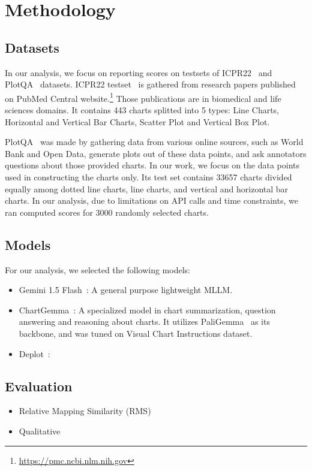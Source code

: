 \documentclass[
	letterpaper, %
]{jdf}
\begin{document}
\section{Methodology}\label{sect:methodology}
\subsection{Datasets}
In our analysis, we focus on reporting scores on testsets of ICPR22~\cite{rousseau2023pattern} and PlotQA~\cite{methani2020plotqa} datasets.
ICPR22 testset~\cite{rousseau2023pattern} is gathered from research papers published on PubMed Central website.\footnote{\href{https://pmc.ncbi.nlm.nih.gov}{https://pmc.ncbi.nlm.nih.gov}}
Those publications are in biomedical and life sciences domains.
It contains 443 charts splitted into 5 types: Line Charts, Horizontal and Vertical Bar Charts, Scatter Plot and Vertical Box Plot.

PlotQA~\cite{methani2020plotqa} was made by gathering data from various online sources, such as World Bank and Open Data, generate plots out of these data points, and ask annotators questions about those provided charts.
In our work, we focus on the data points used in constructing the charts only.
Its test set contains 33657 charts divided equally among dotted line charts, line charts, and vertical and horizontal bar charts.
In our analysis, due to limitations on API calls and time constraints, we ran computed scores for 3000 randomly selected charts.

\subsection{Models}\label{ssect:models}
For our analysis, we selected the following models:
\begin{itemize}
  \item Gemini 1.5 Flash~\cite{team2024gemini}: A general purpose lightweight MLLM.
     \item ChartGemma~\cite{masry2024chartgemma}: A specialized model in chart summarization, question answering and reasoning about charts.
       It utilizes PaliGemma~\cite{beyer2024paligemma} as its backbone, and was tuned on Visual Chart Instructions dataset.
     \item Deplot~\cite{liu2022deplot}: 
       \end{itemize}
\subsection{Evaluation}
\begin{itemize}
  \item Relative Mapping Similarity (RMS)
  \item Qualitative
       \end{itemize}
\end{document}
